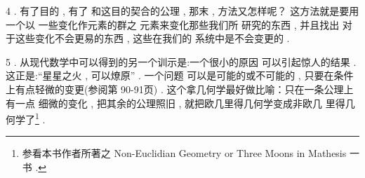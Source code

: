 4 . 有了目的 , 有了 和这目的契合的公理 ,  那末 , 方法又怎样呢？ 这方法就是要用一个以 一些变化作元素的群之 元素来变化那些我们所 研究的东西 , 并且找出 对于这些变化不会更易的东西 , 这些在我们的 系统中是不会变更的 . 

5 . 从现代数学中可以得到的另一个训示是:一个很小的原因 可以引起惊人的结果 . 这正是:“星星之火 , 可以燎原” . 一个问题 可以是可能的或不可能的 , 只要在条件上有点轻微的变更(参阅第 90-91页) . 这个拿几何学最好做比喻：只在一条公理上有一点 细微的变化 , 把其余的公理照旧 , 就把欧几里得几何学变成非欧几 里得几何学了\footnote{参看本书作者所著之 Non-Euclidian Geometry or Three Moons in Mathesis 一书 . } . 

